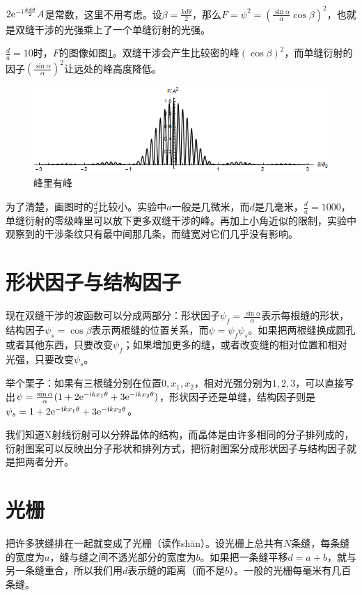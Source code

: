 $2 \mathrm{e}^{-\mathrm{i} \frac{k d \theta}{2}} A$是常数，这里不用考虑。设$\beta=\frac{k d \theta}{2}$，那么$F=\psi^2=(\frac{\sin \alpha}{\alpha} \cos  \beta)^2$，也就是双缝干涉的光强乘上了一个单缝衍射的光强。

$\frac{d}{a}=10$时，$F$的图像如图\ref{fig-silt-diff-plot-2}。双缝干涉会产生比较密的峰$(\cos \beta)^2$，而单缝衍射的因子$(\frac{\sin \alpha}{\alpha})^2$让远处的峰高度降低。
\begin{figure}[htb]
\centering
\includegraphics[scale=0.5]{fig/silt-diff-plot-2}
\caption{峰里有峰}
\label{fig-silt-diff-plot-2}
\end{figure}

为了清楚，画图时的$\frac{d}{a}$比较小。实验中$a$一般是几微米，而$d$是几毫米，$\frac{d}{a}=1000$，单缝衍射的零级峰里可以放下更多双缝干涉的峰。再加上小角近似的限制，实验中观察到的干涉条纹只有最中间那几条，而缝宽对它们几乎没有影响。
\section{形状因子与结构因子}
现在双缝干涉的波函数可以分成两部分：形状因子$\psi_f=\frac{\sin \alpha}{\alpha}$表示每根缝的形状，结构因子$\psi_s=\cos \beta$表示两根缝的位置关系，而$\psi=\psi_f \psi_s$。如果把两根缝换成圆孔或者其他东西，只要改变$\psi_f$；如果增加更多的缝，或者改变缝的相对位置和相对光强，只要改变$\psi_s$。

举个栗子：如果有三根缝分别在位置$0,x_1,x_2$，相对光强分别为$1,2,3$，可以直接写出$\psi=\frac{\sin \alpha}{\alpha}(1+2 \mathrm{e}^{-\mathrm{i} k x_1 \theta}+3 \mathrm{e}^{-\mathrm{i} k x_2 \theta})$，形状因子还是单缝，结构因子则是$\psi_s=1+2 \mathrm{e}^{-\mathrm{i} k x_1 \theta}+3 \mathrm{e}^{-\mathrm{i} k x_2 \theta}$。

我们知道X射线衍射可以分辨晶体的结构，而晶体是由许多相同的分子排列成的，衍射图案可以反映出分子形状和排列方式，把衍射图案分成形状因子与结构因子就是把两者分开。
\section{光栅}
把许多狭缝排在一起就变成了光栅（读作shān）。设光栅上总共有$N$条缝，每条缝的宽度为$a$，缝与缝之间不透光部分的宽度为$b$。如果把一条缝平移$d=a+b$，就与另一条缝重合，所以我们用$d$表示缝的距离（而不是$b$）。一般的光栅每毫米有几百条缝。

